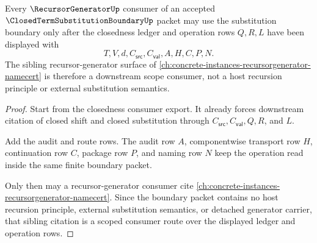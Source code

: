 \begin{theorem}
\label{thm:closed-term-substitution-boundary-recursor-generator-scope-lock}
Every $\RecursorGeneratorUp$ consumer of an accepted $\ClosedTermSubstitutionBoundaryUp$ packet may use the substitution boundary only after the closedness ledger and operation rows $Q,R,L$ have been displayed with
$$
T,V,d,C_{\mathsf{src}},C_{\mathsf{val}},A,H,C,P,N.
$$
The sibling recursor-generator surface of \autoref{ch:concrete-instances-recursorgenerator-namecert} is therefore a downstream scope consumer, not a host recursion principle or external substitution semantics.
\end{theorem}
\begin{proof}
Start from the closedness consumer export. It already forces downstream citation of closed shift and closed substitution through $C_{\mathsf{src}},C_{\mathsf{val}},Q,R$, and $L$.

Add the audit and route rows. The audit row $A$, componentwise transport row $H$, continuation row $C$, package row $P$, and naming row $N$ keep the operation read inside the same finite boundary packet.

Only then may a recursor-generator consumer cite \autoref{ch:concrete-instances-recursorgenerator-namecert}. Since the boundary packet contains no host recursion principle, external substitution semantics, or detached generator carrier, that sibling citation is a scoped consumer route over the displayed ledger and operation rows.
\end{proof}

